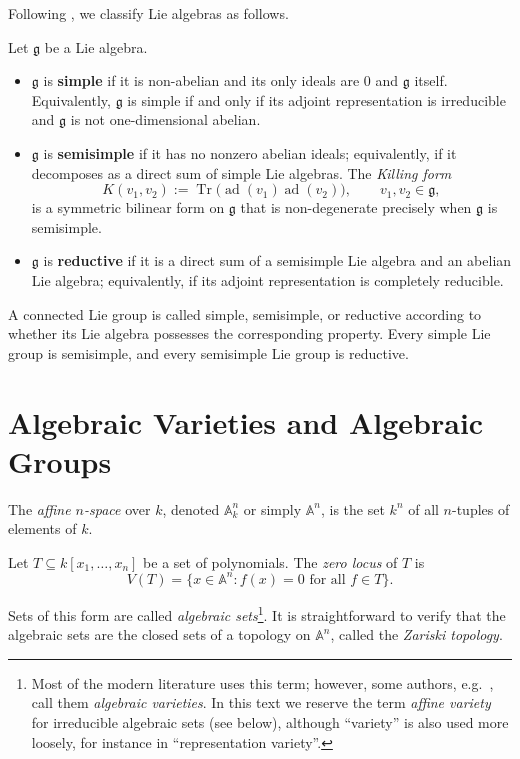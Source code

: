 Following \cite{maret_note_nodate}, we classify Lie algebras as follows.

\begin{definition}
    Let $\mathfrak{g}$ be a Lie algebra.
    \begin{itemize}
        \item $\mathfrak{g}$ is \textbf{simple} if it is non-abelian and its only ideals are $0$ and $\mathfrak{g}$ itself. Equivalently, $\mathfrak{g}$ is simple if and only if its adjoint representation is irreducible and $\mathfrak{g}$ is not one-dimensional abelian.
        \item $\mathfrak{g}$ is \textbf{semisimple} if it has no nonzero abelian ideals; equivalently, if it decomposes as a direct sum of simple Lie algebras. The \emph{Killing form}
        \[
            K(v_1, v_2) := \operatorname{Tr}\big(\operatorname{ad}(v_1)\operatorname{ad}(v_2)\big), \qquad v_1, v_2 \in \mathfrak{g},
        \]
        is a symmetric bilinear form on $\mathfrak{g}$ that is non-degenerate precisely when $\mathfrak{g}$ is semisimple.
        \item $\mathfrak{g}$ is \textbf{reductive} if it is a direct sum of a semisimple Lie algebra and an abelian Lie algebra; equivalently, if its adjoint representation is completely reducible.
    \end{itemize}
\end{definition}

A connected Lie group is called simple, semisimple, or reductive according to whether its Lie algebra possesses the corresponding property. Every simple Lie group is semisimple, and every semisimple Lie group is reductive.

\section{Algebraic Varieties and Algebraic Groups}

The \emph{affine $n$-space} over $k$, denoted $\mathbb{A}_k^n$ or simply $\mathbb{A}^n$, is the set $k^n$ of all $n$-tuples of elements of $k$.

\begin{definition}
    Let $T \subseteq k[x_1, \dots, x_n]$ be a set of polynomials. The \emph{zero locus} of $T$ is
    \[
        V(T) = \{ x \in \mathbb{A}^n : f(x) = 0 \text{ for all } f \in T \}.
    \]
\end{definition}

Sets of this form are called \emph{algebraic sets}\footnote{Most of the modern literature uses this term; however, some authors, e.g.\ \cite{maret_note_nodate, casimiroCharacterVarietiesTheir2026}, call them \emph{algebraic varieties}. In this text we reserve the term \emph{affine variety} for irreducible algebraic sets (see below), although ``variety'' is also used more loosely, for instance in ``representation variety''.}. It is straightforward to verify that the algebraic sets are the closed sets of a topology on $\mathbb{A}^n$, called the \emph{Zariski topology}.

